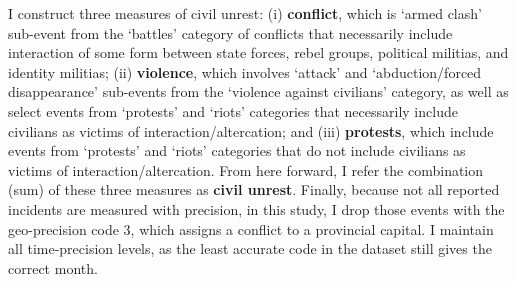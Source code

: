 \documentclass[11pt]{article}
\begin{document}
I construct three measures of civil unrest: (i) \textbf{conflict}, which is `armed clash' sub-event from the `battles' category of conflicts that necessarily include interaction of some form between state forces, rebel groups, political militias, and identity militias; (ii) \textbf{violence}, which involves `attack' and `abduction/forced disappearance' sub-events from the `violence against civilians' category, as well as select events from `protests' and `riots' categories that necessarily include civilians as victims of interaction/altercation; and (iii) \textbf{protests}, which include events from `protests' and `riots' categories that do not include civilians as victims of interaction/altercation. From here forward, I refer the combination (sum) of these three measures as \textbf{civil unrest}. Finally, because not all reported incidents are measured with precision, in this study, I drop those events with the geo-precision code 3, which assigns a conflict to a provincial capital. I maintain all time-precision levels, as the least accurate code in the dataset still gives the correct month. 

%
%
%
\end{document}
